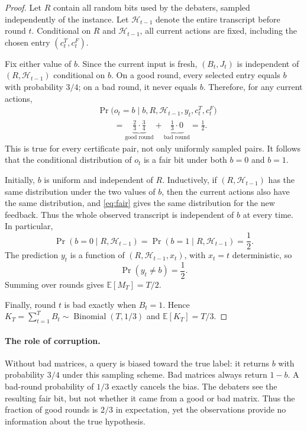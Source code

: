 \documentclass[11pt]{article}
\newcommand{\E}{\mathbb{E}}
\DeclareMathOperator{\Bin}{Binomial}
\theoremstyle{remark}
\begin{document}
\begin{proof}
Let $R$ contain all random bits used by the debaters, sampled independently of
the instance. Let $\mathcal H_{t-1}$ denote the entire transcript before
round $t$. Conditional on $R$ and $\mathcal H_{t-1}$, all current actions are
fixed, including the chosen entry $(c_t^T,c_t^F)$.

Fix either value of $b$. Since the current input is fresh, $(B_t,J_t)$ is
independent of $(R,\mathcal H_{t-1})$ conditional on $b$. On a good round,
every selected entry equals $b$ with probability $3/4$; on a bad round,
it never equals $b$. Therefore, for any current actions,
\begin{align}
 &\Pr\bigl(o_t=b\mid b,R,\mathcal H_{t-1},y_t,c_t^T,c_t^F\bigr)
 \nonumber\\
 &\hspace{2em}=
 \underbrace{\frac23\cdot\frac34}_{\text{good round}}
 +
 \underbrace{\frac13\cdot0}_{\text{bad round}}
 =\frac12.\label{eq:fair}
\end{align}
This is true for every certificate pair, not only uniformly sampled pairs.
It follows that the conditional distribution of $o_t$ is a fair bit under
both $b=0$ and $b=1$.

Initially, $b$ is uniform and independent of $R$. Inductively, if
$(R,\mathcal H_{t-1})$ has the same distribution under the two values of $b$,
then the current actions also have the same distribution, and
\eqref{eq:fair} gives the same distribution for the new feedback. Thus the
whole observed transcript is independent of $b$ at every time. In particular,
\[
 \Pr(b=0\mid R,\mathcal H_{t-1})
 =\Pr(b=1\mid R,\mathcal H_{t-1})=\frac12.
\]
The prediction $y_t$ is a function of $(R,\mathcal H_{t-1},x_t)$, with
$x_t=t$ deterministic, so
\[
                     \Pr(y_t\ne b)=\frac12.
\]
Summing over rounds gives $\E[M_T]=T/2$.

Finally, round $t$ is bad exactly when $B_t=1$. Hence
$K_T=\sum_{t=1}^T B_t\sim\Bin(T,1/3)$ and $\E[K_T]=T/3$.
\end{proof}

\paragraph{The role of corruption.}
Without bad matrices, a query is biased toward the true label: it returns
$b$ with probability $3/4$ under this sampling scheme. Bad matrices always
return $1-b$. A bad-round probability of $1/3$ exactly cancels the bias.
The debaters see the resulting fair bit, but not whether it came from a good
or bad matrix. Thus the fraction of good rounds is $2/3$ in expectation,
yet the observations provide no information about the true hypothesis.
\end{document}

